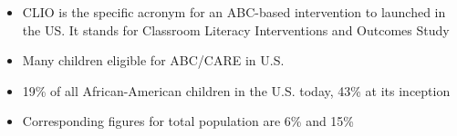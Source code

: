 \documentclass[static]{JJH-Beamer}
\begin{document}

\begin{itemize}
\item CLIO is the specific acronym for an ABC-based intervention to launched in the US. It stands for Classroom Literacy Interventions and Outcomes Study
\end{itemize}

\begin{frame}

\begin{itemize}
\item Many children eligible for ABC/CARE in U.S.
\item 19\% of all African-American children in the U.S. today, 43\% at its inception
\item Corresponding figures for total population are 6\% and 15\%
\end{itemize}

\end{frame}

\end{document}
